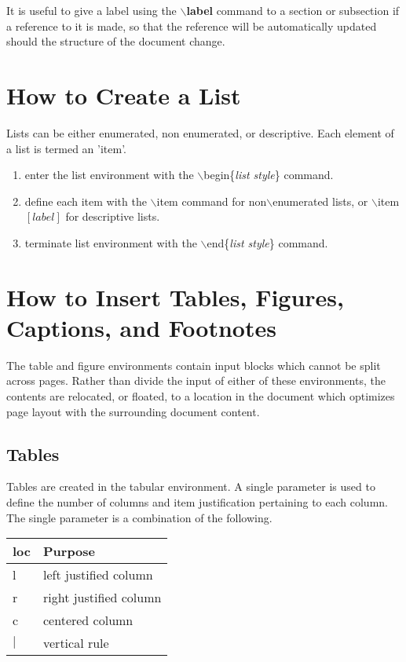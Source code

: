It is useful to give a label using the \textbf{$\backslash$label} command to a section or subsection if a reference to it is made, so that the reference will be automatically updated should the structure of the document change.

\section{How to Create a List}
 Lists can be either enumerated, non enumerated, or descriptive. Each element of a list is termed an 'item'.

 \begin{enumerate}
    \item enter the list environment with the $\backslash$begin\{\textit{list style}\} command.
    \vspace{-2mm}
    \item define each item with the $\backslash$item command for non$\backslash$enumerated lists, or $\backslash$item$[\textit{label}]$ for descriptive lists.
    \vspace{-2mm}
    \item terminate list environment with the $\backslash$end\{\textit{list style}\} command.
 \end{enumerate}

\section{How to Insert Tables, Figures, Captions, and Footnotes}
 The table and figure environments contain input blocks which cannot be split across pages.  Rather than divide the input of either of these
 environments, the contents are relocated, or floated, to a location in the document which optimizes page layout with the surrounding document content.

\subsection{Tables}
 Tables are created in the tabular environment. A single parameter is used to define the number of columns and item justification pertaining to each column.  The single parameter is a combination of the following.
 \\
 \begin{center}
 \begin{tabular}{|l|l|} \hline
    \textbf{loc}    &   \textbf{Purpose}        \\ \hline
    l               &   left justified column   \\ \hline
    r               &   right justified column  \\ \hline
    c               &   centered column         \\ \hline
    $|$             &   vertical rule           \\ \hline
 \end{tabular}
 \end{center}

